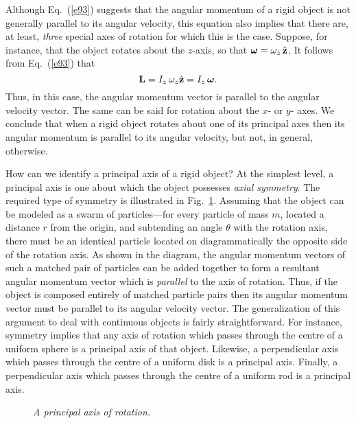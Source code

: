 Although Eq.~(\ref{e93}) suggests that the angular momentum of a rigid object
is not generally parallel to its angular velocity, this equation also implies that there
are, at least, {\em three} special axes of rotation  for which this is the case. 
Suppose, for instance, that the object rotates about the $z$-axis, so that
$\mbox{\boldmath$\omega$} = \omega_z\,\hat{\bf z}$. It follows from Eq.~(\ref{e93}) that
\begin{equation}
{\bf L} = I_z\,\omega_z\hat{\bf z} = I_z\,\mbox{\boldmath$\omega$}.
\end{equation}
Thus, in this case, the angular momentum vector is parallel to the angular
velocity vector. The same can be said for rotation about the $x$- or $y$- axes. 
We conclude that when a rigid object rotates about one of its principal axes
then its angular momentum is parallel to its angular velocity, but not, in general,
otherwise.

How can we identify a principal axis of a rigid object? At the simplest level,
a principal axis is one about which the object possesses {\em axial symmetry}. 
The required type of symmetry is illustrated in Fig.~\ref{f87}. Assuming that
the object can be modeled as a swarm of particles---for every
particle of mass $m$, located a distance $r$ from the origin, and subtending an
angle $\theta$ with the rotation axis, there must be an identical particle located on
diagrammatically the opposite side of the rotation axis. As shown in the diagram,
the angular momentum vectors of such a matched pair of particles can be added together to form
a resultant angular momentum vector which is {\em parallel} to the axis of rotation. Thus, if
the object is composed entirely of matched particle pairs then its angular momentum
vector must be parallel to its angular velocity vector. The generalization of this
argument to deal with continuous objects is fairly straightforward.  For instance, symmetry implies
that any axis of rotation which passes through the centre of a uniform sphere is
a principal axis of that object. Likewise, a perpendicular axis which passes through the
centre of a uniform disk is a principal axis. Finally, a perpendicular axis which passes
through the centre of a uniform rod is  a principal axis. 

\begin{figure}
\epsfysize=2.5in
\centerline{}
\caption{\em A principal axis of rotation.}\label{f87}  
\end{figure}


